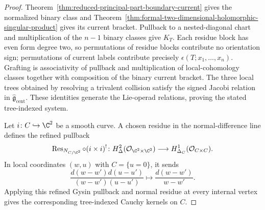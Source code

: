 \documentclass[11pt]{memoir}
\begin{document}
\begin{proof}
  Theorem~\ref{thm:reduced-principal-part-boundary-current} gives the
  normalized binary class and
  Theorem~\ref{thm:formal-two-dimensional-holomorphic-singular-product}
  gives its current bracket.  Pullback to a nested-diagonal chart and
  multiplication of the \(n-1\) binary classes give \(K_T\).  Each
  residue block has even form degree two, so permutations of residue
  blocks contribute no orientation sign; permutations of current labels
  contribute precisely \(\epsilon(T;x_1,\ldots,x_n)\).  Grafting is
  associativity of pullback and multiplication of local-cohomology
  classes together with composition of the binary current bracket.  The
  three local trees obtained by resolving a trivalent collision satisfy
  the signed Jacobi relation in
  \(\widehat{\mathfrak g}_{\mathrm{cent}}\).  These identities generate
  the Lie-operad relations, proving the stated tree-indexed system.

  Let \(i\colon C\hookrightarrow\C^2\) be a smooth curve.  A chosen
  residue in the normal-difference line defines the refined pullback
  \[
    \operatorname{Res}_{N_{C/\C^2}}\circ(i\times i)^!
    \colon H^2_\Delta(\mathcal O_{\C^2\times\C^2})
    \longrightarrow H^1_{\Delta_C}(\mathcal O_{C\times C}).
  \]
  In local coordinates \((w,u)\) with \(C=\{u=0\}\), it sends
  \[
    \frac{d(w-w')d(u-u')}{(w-w')(u-u')}
    \longmapsto \frac{d(w-w')}{w-w'}.
  \]
  Applying this refined Gysin pullback and normal residue at every
  internal vertex gives the corresponding tree-indexed Cauchy kernels
  on \(C\).
\end{proof}
\end{document}
